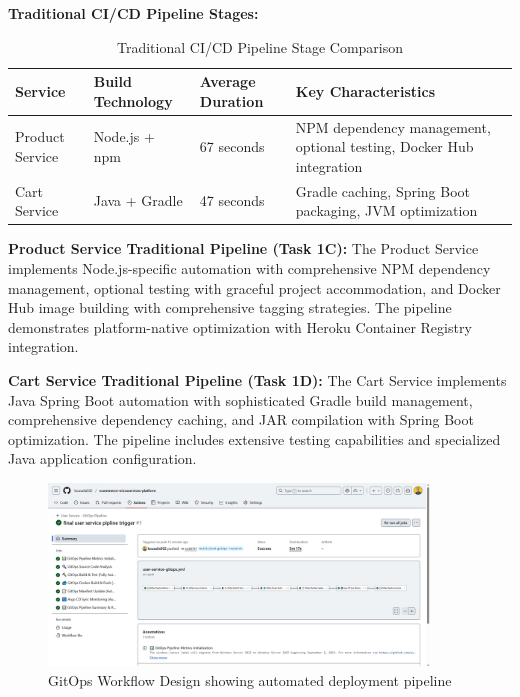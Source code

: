 \textbf{Traditional CI/CD Pipeline Stages:}

\begin{table}[H]
\centering
\caption{Traditional CI/CD Pipeline Stage Comparison}
\label{tab:traditional-pipeline-stages}
\begin{tabular}{|p{3cm}|p{3cm}|p{3cm}|p{5cm}|}
\hline
\textbf{Service} & \textbf{Build Technology} & \textbf{Average Duration} & \textbf{Key Characteristics} \\
\hline
Product Service & Node.js + npm & 67 seconds & NPM dependency management, optional testing, Docker Hub integration \\
\hline
Cart Service & Java + Gradle & 47 seconds & Gradle caching, Spring Boot packaging, JVM optimization \\
\hline
\end{tabular}
\end{table}

\textbf{Product Service Traditional Pipeline (Task 1C):}
The Product Service implements Node.js-specific automation with comprehensive NPM dependency management, optional testing with graceful project accommodation, and Docker Hub image building with comprehensive tagging strategies. The pipeline demonstrates platform-native optimization with Heroku Container Registry integration.

\textbf{Cart Service Traditional Pipeline (Task 1D):}
The Cart Service implements Java Spring Boot automation with sophisticated Gradle build management, comprehensive dependency caching, and JAR compilation with Spring Boot optimization. The pipeline includes extensive testing capabilities and specialized Java application configuration.

\begin{figure}[H]
\centering
\includegraphics[width=0.9\textwidth]{figures/chapter4/gitops-workflow-design.png}
\caption{GitOps Workflow Design showing automated deployment pipeline}
\label{fig:gitops-workflow-design}
\end{figure}

